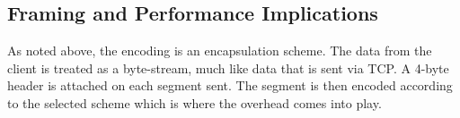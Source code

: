 \subsection{Framing and Performance Implications}
As noted above, the encoding is an encapsulation scheme. The data from the client is treated as a byte-stream, much like data that is sent via TCP. A 4-byte header is attached on each segment sent. The segment is then encoded according to the selected scheme which is where the overhead comes into play. 








